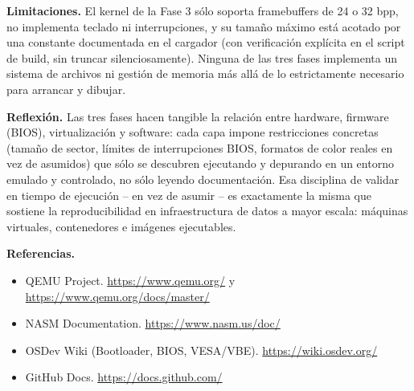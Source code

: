 \documentclass[11pt,a4paper]{article}
\begin{document}
\textbf{Limitaciones.} El kernel de la Fase 3 sólo soporta framebuffers de 24 o 32 bpp, no
implementa teclado ni interrupciones, y su tamaño máximo está acotado por una constante
documentada en el cargador (con verificación explícita en el script de build, sin truncar
silenciosamente). Ninguna de las tres fases implementa un sistema de archivos ni gestión de
memoria más allá de lo estrictamente necesario para arrancar y dibujar.

\textbf{Reflexión.} Las tres fases hacen tangible la relación entre hardware, firmware (BIOS),
virtualización y software: cada capa impone restricciones concretas (tamaño de sector, límites
de interrupciones BIOS, formatos de color reales en vez de asumidos) que sólo se descubren
ejecutando y depurando en un entorno emulado y controlado, no sólo leyendo documentación. Esa
disciplina de validar en tiempo de ejecución -- en vez de asumir -- es exactamente la misma que
sostiene la reproducibilidad en infraestructura de datos a mayor escala: máquinas virtuales,
contenedores e imágenes ejecutables.

\textbf{Referencias.}
\begin{itemize}[nosep]
\item QEMU Project. \url{https://www.qemu.org/} y \url{https://www.qemu.org/docs/master/}
\item NASM Documentation. \url{https://www.nasm.us/doc/}
\item OSDev Wiki (Bootloader, BIOS, VESA/VBE). \url{https://wiki.osdev.org/}
\item GitHub Docs. \url{https://docs.github.com/}
\end{itemize}
\end{document}
